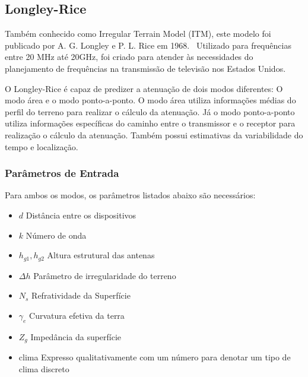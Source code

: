 \subsection{Longley-Rice}

Também conhecido como Irregular Terrain Model (ITM), este modelo foi publicado por A. G. Longley e P. L. Rice em 1968.~\cite{longleyrice} Utilizado para frequências entre 20 MHz até 20GHz, foi criado para atender às necessidades do planejamento de frequências na transmissão de televisão nos Estados Unidos.

O Longley-Rice é capaz de predizer a atenuação de dois modos diferentes: O modo área e o modo ponto-a-ponto. O modo área utiliza informações médias do perfil do terreno para realizar o cálculo da atenuação. Já o modo ponto-a-ponto utiliza informações específicas do caminho entre o transmissor e o receptor para realização o cálculo da atenuação.
Também possui estimativas da variabilidade do tempo e localização.

\subsubsection{Parâmetros de Entrada}

Para ambos os modos, os parâmetros listados abaixo são necessários:

\begin{itemize}
\item \begin{math}d\end{math} Distância entre os dispositivos
\item \begin{math}k\end{math} Número de onda
\item \begin{math}h_{g1}, h_{g2}\end{math} Altura estrutural das antenas
\item \begin{math}\Delta h\end{math} Parâmetro de irregularidade do terreno
\item \begin{math}N_s\end{math} Refratividade da Superfície
\item \begin{math}\gamma _e\end{math} Curvatura efetiva da terra
\item \begin{math}Z_g\end{math} Impedância da superfície
\item clima Expresso qualitativamente com um número para denotar um tipo de clima discreto
\end{itemize}

